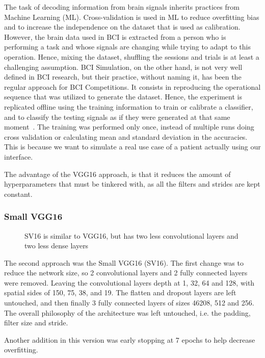 \documentclass[conference]{IEEEtran}
\begin{document}
The task of decoding information from brain signals inherits practices from Machine Learning (ML). Cross-validation is used in ML to reduce overfitting bias and to increase the independence on the dataset that is used as calibration. However, the brain data used in BCI is extracted from a person who is performing a task and whose signals are changing while trying to adapt to this operation. Hence, mixing the dataset, shuffling the sessions and trials is at least a challenging assumption. BCI Simulation, on the other hand, is not very well defined in BCI research, but their practice, without naming it, has been the regular approach for BCI Competitions. It consists in reproducing the operational sequence that was utilized to generate the dataset. Hence, the experiment is replicated offline using the training information to train or calibrate a classifier, and to classify the testing signals as if they were generated at that same moment~\cite{ramele.2018}. The training was performed only once, instead of multiple runs doing cross validation or calculating mean and standard deviation in the accuracies. This is because we want to simulate a real use case of a patient actually using our interface.

The advantage of the VGG16 approach, is that it reduces the amount of hyperparameters that must be tinkered with, as all the filters and strides are kept constant. 

\subsubsection{Small VGG16}
\begin{figure}[h]
\centering

\caption[SVG16 Neural Network]{SV16 is similar to VGG16, but has two less convolutional layers and two less dense layers}
\label{fig:nnv2}
\end{figure}

The second approach was the Small VGG16  (SV16). The first change was to reduce the network size, so 2 convolutional layers and 2 fully connected layers were removed. Leaving the convolutional layers depth at 1, 32, 64 and 128, with spatial sides of 150, 75, 38, and 19. The flatten and dropout layers are left untouched, and then finally 3 fully connected layers of sizes 46208, 512 and 256. The overall philosophy of the architecture was left untouched, i.e. the padding, filter size and stride.

Another addition in this version was early stopping at 7 epochs to help decrease overfitting. 
\end{document}
